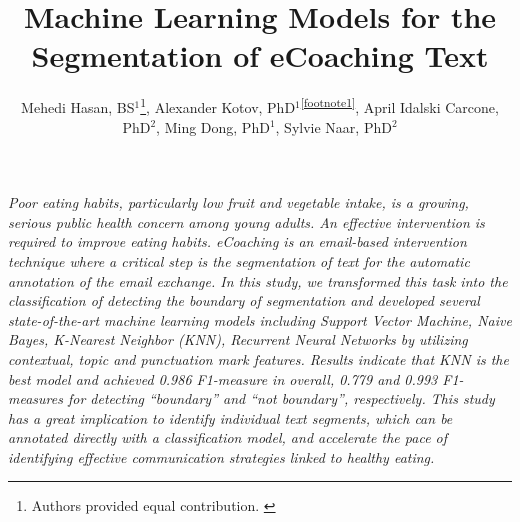 \documentclass{amia}
\begin{document}
\title{Machine Learning Models for the Segmentation of eCoaching Text}

\author{Mehedi Hasan, BS$^{1}$\footnote[1]{Authors provided equal contribution. \label{footnote1}}, Alexander Kotov, PhD$^{1}$\textsuperscript{\ref{footnote1}}, April Idalski Carcone, PhD$^{2}$, Ming Dong, PhD$^{1}$, Sylvie Naar, PhD$^{2}$}


\maketitle

\textit{Poor eating habits, particularly low fruit and vegetable intake, is a growing, serious public health concern among young adults. An effective intervention is required to improve eating habits. eCoaching is an email-based intervention technique where a critical step is the segmentation of text for the automatic annotation of the email exchange. In this study, we transformed this task into the classification of detecting the boundary of segmentation and developed several state-of-the-art machine learning models including Support Vector Machine, Naive Bayes, K-Nearest Neighbor (KNN), Recurrent Neural Networks by utilizing contextual, topic and punctuation mark features. Results indicate that KNN is the best model and achieved 0.986 F1-measure in overall, 0.779 and 0.993 F1-measures for detecting ``boundary'' and ``not boundary'', respectively. This study has a great implication to identify individual text segments, which can be annotated directly with a classification model, and accelerate the pace of identifying effective communication strategies linked to healthy eating.}
\end{document}
